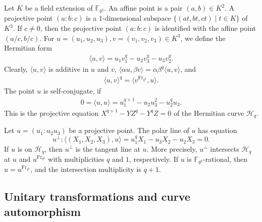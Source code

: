 \documentclass[11pt]{amsart}
\theoremstyle{plain}
\theoremstyle{definition}
\theoremstyle{remark}
\newcommand{\Frob}{{\mathrm{Fr}_{q^2}}}
\begin{document}
Let $K$ be a field extension of $\mathbb{F}_{q^2}$. An affine point is a pair $(a,b)\in K^2$. A projective point $(a:b:c)$ is a $1$-dimensional subspace $\{(at,bt,ct) \mid t\in K\}$ of $K^3$. If $c\neq 0$, then the projective point $(a:b:c)$ is identified with the affine point $(a/c,b/c)$. For $u=(u_1,u_2,u_3), v=(v_1,v_2,v_3) \in K^3$, we define the Hermitian form 
\begin{align*} %
\langle u,v \rangle = u_1v_1^q-u_2v_3^q-u_3v_2^q.
\end{align*}
Clearly, $\langle u,v \rangle$ is additive in $u$ and $v$, $\langle \alpha u, \beta v\rangle =\alpha \beta^q \langle u,v \rangle$, and 
\begin{align*} %
\langle u,v \rangle^q=\langle v^\Frob,u \rangle.
\end{align*}
The point $u$ is self-conjugate, if 
\begin{align*} %
0=\langle u,u \rangle = u_1^{q+1}-u_2u_3^2-u_2^qu_3.
\end{align*}
This is the projective equation $X^{q+1}-YZ^q-Y^qZ=0$ of the Hermitian curve $\mathscr{H}_q$. 

Let $u=(u_1:u_2u_3)$ be a projective point. The polar line of $u$ has equation
\[u^\perp: \langle (X_1,X_2,X_3), u \rangle = u_1^qX_1-u_3X_2-u_2X_3=0.\]
If $u$ is on $\mathscr{H}_q$, then $u^\perp$ is the tangent line at $u$. More precisely, $u^\perp$ intersects $\mathscr{H}_q$ at $u$ and $u^\Frob$ with multiplicities $q$ and $1$, respectively. If $u$ is $\mathbb{F}_{q^2}$-rational, then $u=u^\Frob$, and the intersection multiplicity is $q+1$. 

\subsection{Unitary transformations and curve automorphism} \label{ssec:unitary}
\end{document}
